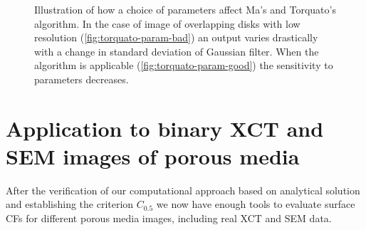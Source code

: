 \documentclass[reprint,amsmath,amssymb,aps,pre,showkeys,showpacs]{revtex4-1}
\begin{document}
\begin{figure}[!pt]
  \centering
  \hfill
  \caption[]{Illustration of how a choice of parameters affect Ma's and
    Torquato's algorithm. In the case of image of overlapping disks with low
    resolution (\cref{fig:torquato-param-bad}) an output varies drastically with
    a change in standard deviation of Gaussian filter. When the algorithm is
    applicable (\cref{fig:torquato-param-good}) the sensitivity to parameters
    decreases.}
  \label{fig:torquato-param}
\end{figure}


\section{Application to binary XCT and SEM images of porous media}
\label{sec:application}
After the verification of our computational approach based on analytical
solution and establishing the criterion $C_{0.5}$ we now have enough tools to
evaluate surface CFs for different porous media images, including real XCT and
SEM data.
\end{document}

